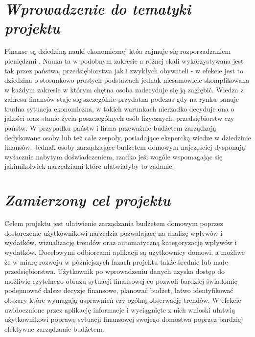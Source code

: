 \documentclass[a4paper,10pt]{report}
\newcommand{\customstylechapter}[1]{\large{\textit{#1}}}
\begin{document}
\renewcommand*\contentsname{Spis treści}
\tableofcontents                    %


\chapter{\customstylechapter{Wprowadzenie do tematyki projektu}}
{Finanse są dziedziną nauki ekonomicznej któa zajmuje się rozporzadzaniem 
pieniędzmi \cite{wiki_ekonomia}. Nauka ta w podobnym zakresie a różnej skali 
wykorzystywana jest tak przez państwa, przedsiębiorstwa jak i zwykłych obywateli
 - w efekcie jest to dziedzina o stosunkowo prostych podstawach jednak niesamowicie
skomplikowana w każdym zakresie w którym chętna osoba zadecyduje się ją zagłębić. 
Wiedza z zakresu finansów staje się szczególnie przydatna podczas gdy na rynku 
panuje trudna sytuacja ekonomiczna, w takich warunkach nierzadko decyduje ona o 
jakości oraz stanie życia poszczególnych osób fizycznych, przedsiębiorstw czy 
państw. W przypadku państw i firma przeważnie budżetem zarządzają dedykowane 
osoby lub też całe zespoły, posiadające ekspercką wiedze w dziedzinie finansów. 
Jednak osoby zarządzające budżetem domowym najczęściej dysponują wyłacznie 
nabytym doświadczeniem, rzadko jeśi wogóle wspomagając się jakimikolwiek 
narzędziami które ułatwiałyby to zadanie.}
%
\chapter{\customstylechapter{Zamierzony cel projektu}}
{Celem projektu jest ułatwienie zarządzania budżetem domowym poprzez 
dostarczenie użytkownikowi narzędzia pozwalające na analizę wpływów i wydatków, 
wizualizację trendów oraz automatyczną kategoryzację wpływów i wydatków. 
Docelowymi odbiorcami aplikacji są użytkownicy domowi, a możliwe że w miarę 
rozwoju w późniejszych fazach projektu także średnie lub małe przedsiębiorstwa. 
Użytkownik po wprowadzeniu danych uzyska dostęp do możliwie czytelnego obrazu 
sytuacji finansowej co pozwoli bardziej świadomie podejmować dalsze decyzje 
finansowe, planować budżet, łatwo identyfikować obszary które wymagają 
usprawnień czy ogólną obserwację trendów. W efekcie uwidocznione przez aplikację 
informacje i wyciągnięte z nich wnioski ułatwią użytkownikowi poprawę sytuacji 
finansowej swojego domostwa poprzez bardziej efektywne zarządzanie budżetem.}
%
\end{document}
